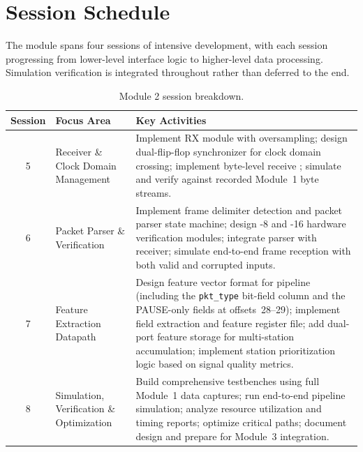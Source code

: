 \documentclass[11pt,letterpaper]{article}
\begin{document}
	\newpage
	\section{Session Schedule}

	The module spans four sessions of intensive \RTL{} development, with each session progressing from lower-level interface logic to higher-level data processing. Simulation verification is integrated throughout rather than deferred to the end.

	\begin{table}[ht!]
		\centering
		\caption{Module 2 session breakdown.}
		\label{tab:schedule}
		\renewcommand{\arraystretch}{1.4}
		\begin{tabularx}{\textwidth}{c l X}
			\toprule
			\textbf{Session} & \textbf{Focus Area} & \textbf{Key Activities} \\
			\midrule
			5 & \UART{} Receiver \& Clock Domain Management &
			Implement \UART{} RX module with oversampling; design dual-flip-flop synchronizer for clock domain crossing; implement byte-level receive \FIFO{}; simulate and verify against recorded Module~1 byte streams. \\
			6 & Packet Parser \& \CRC{} Verification &
			Implement frame delimiter detection and packet parser state machine; design \CRC{}-8 and \CRC{}-16 hardware verification modules; integrate parser with \UART{} receiver; simulate end-to-end frame reception with both valid and corrupted inputs. \\
			7 & Feature Extraction Datapath &
			Design feature vector format for \ML{} pipeline (including the \texttt{pkt\_type} bit-field column and the PAUSE-only fields at offsets~28--29); implement field extraction and feature register file; add dual-port \BRAM{} feature storage for multi-station accumulation; implement station prioritization logic based on signal quality metrics. \\
			8 & Simulation, Verification \& Optimization &
			Build comprehensive testbenches using full Module~1 data captures; run end-to-end pipeline simulation; analyze resource utilization and timing reports; optimize critical paths; document design and prepare \RTL{} for Module~3 integration. \\
			\bottomrule
		\end{tabularx}
	\end{table}
\end{document}
